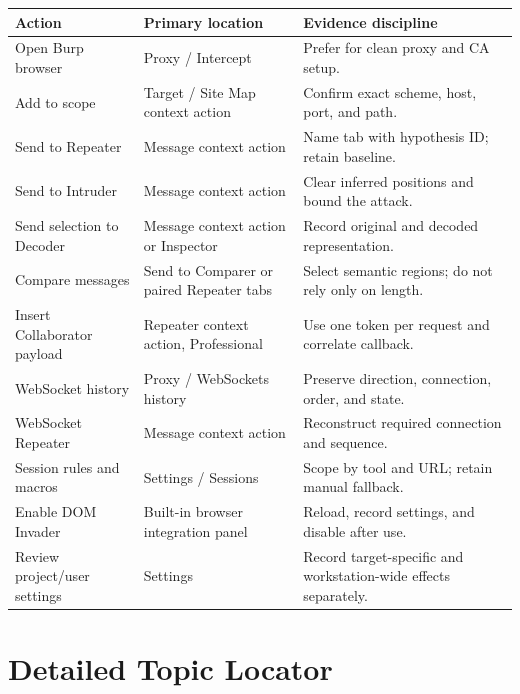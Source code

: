 \documentclass[11pt]{article}
\begin{document}
\begin{longtable}{@{}L{0.25\textwidth}L{0.28\textwidth}>{\raggedright\arraybackslash}p{0.37\textwidth}@{}}
\toprule
\textbf{Action} & \textbf{Primary location} & \textbf{Evidence discipline} \\
\midrule
\endhead
Open Burp browser & Proxy / Intercept & Prefer for clean proxy and CA setup. \\
Add to scope & Target / Site Map context action & Confirm exact scheme, host, port, and path. \\
Send to Repeater & Message context action & Name tab with hypothesis ID; retain baseline. \\
Send to Intruder & Message context action & Clear inferred positions and bound the attack. \\
Send selection to Decoder & Message context action or Inspector & Record original and decoded representation. \\
Compare messages & Send to Comparer or paired Repeater tabs & Select semantic regions; do not rely only on length. \\
Insert Collaborator payload & Repeater context action, Professional & Use one token per request and correlate callback. \\
WebSocket history & Proxy / WebSockets history & Preserve direction, connection, order, and state. \\
WebSocket Repeater & Message context action & Reconstruct required connection and sequence. \\
Session rules and macros & Settings / Sessions & Scope by tool and URL; retain manual fallback. \\
Enable DOM Invader & Built-in browser integration panel & Reload, record settings, and disable after use. \\
Review project/user settings & Settings & Record target-specific and workstation-wide effects separately. \\
\bottomrule
\end{longtable}

\section{Detailed Topic Locator}
\end{document}

